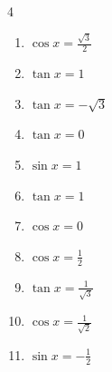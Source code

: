 \begin{multicols}{4}
\begin{enumerate}
  \item $\displaystyle \cos{x}  = \frac{\sqrt{3}}{2}$


  \item $\displaystyle \tan{x}  = 1$


  \item $\displaystyle \tan{x}  = -\sqrt{3}$


  \item $\displaystyle \tan{x}  = 0$

        \phantom{$\displaystyle x = 0 , \pi$}

  \item $\displaystyle \sin{x}  = 1$


  \item $\displaystyle \tan{x}  = 1$


  \item $\displaystyle \cos{x}  = 0$


  \item $\displaystyle \cos{x}  = \frac{1}{2}$


  \item $\displaystyle \tan{x}  = \frac{1}{\sqrt{3}}$


\columnbreak %

\resetques

  \item $\displaystyle \cos{x}  = \frac{1}{\sqrt{2}}$


  \item $\displaystyle \sin{x}  = -\frac{1}{2}$



\end{enumerate}
\end{multicols}
